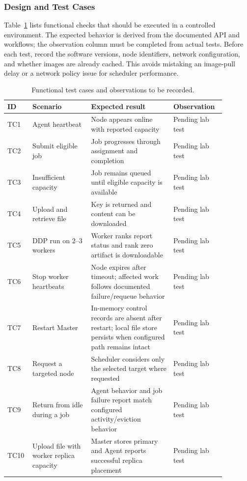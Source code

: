 \documentclass{article}
\begin{document}
	\subsubsection{Design and Test Cases}
Table~\ref{tab:testcases} lists functional checks that should be executed in a controlled environment. The expected behavior is derived from the documented API and workflows; the observation column must be completed from actual tests. Before each test, record the software versions, node identifiers, network configuration, and whether images are already cached. This avoids mistaking an image-pull delay or a network policy issue for scheduler performance.
\begin{table}[h!]
\centering
\caption{Functional test cases and observations to be recorded.}
\label{tab:testcases}
\begin{tabular}{|p{0.08\linewidth}|p{0.25\linewidth}|p{0.35\linewidth}|p{0.2\linewidth}|}
\hline
ID & Scenario & Expected result & Observation \\
\hline
TC1 & Agent heartbeat & Node appears online with reported capacity & Pending lab test \\
\hline
TC2 & Submit eligible job & Job progresses through assignment and completion & Pending lab test \\
\hline
TC3 & Insufficient capacity & Job remains queued until eligible capacity is available & Pending lab test \\
\hline
TC4 & Upload and retrieve file & Key is returned and content can be downloaded & Pending lab test \\
\hline
TC5 & DDP run on 2--3 workers & Worker ranks report status and rank zero artifact is downloadable & Pending lab test \\
\hline
TC6 & Stop worker heartbeats & Node expires after timeout; affected work follows documented failure/requeue behavior & Pending lab test \\
\hline
TC7 & Restart Master & In-memory control records are absent after restart; local file store persists when configured path remains intact & Pending lab test \\
\hline
TC8 & Request a targeted node & Scheduler considers only the selected target where requested & Pending lab test \\
\hline
TC9 & Return from idle during a job & Agent behavior and job failure report match configured activity/eviction behavior & Pending lab test \\
\hline
TC10 & Upload file with worker replica capacity & Master stores primary and Agent reports successful replica placement & Pending lab test \\

\end{tabular}
\end{table}
\end{document}

